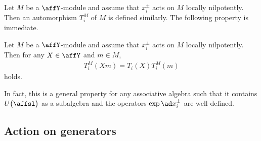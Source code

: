 Let $M$ be a $\affY$-module and assume that $x_i^{\pm}$ acts on $M$ locally nilpotently. Then an automorphism $T_i^M$ of $M$ is defined similarly. The following property is immediate.
\begin{prop}Let $M$ be a $\affY$-module and assume that $x_i^{\pm}$ acts on $M$ locally nilpotently. Then for any $X \in \affY$ and $m \in M$,
\begin{gather*}
T_i^M(Xm)=T_i(X)T_i^M(m)
\end{gather*}
holds.
\end{prop}

In fact, this is a general property for any associative algebra such that it contains $U\big(\affsl\big)$ as a subalgebra and the operators $\exp\ad x_i^{\pm}$ are well-defined.

\subsection{Action on generators}

